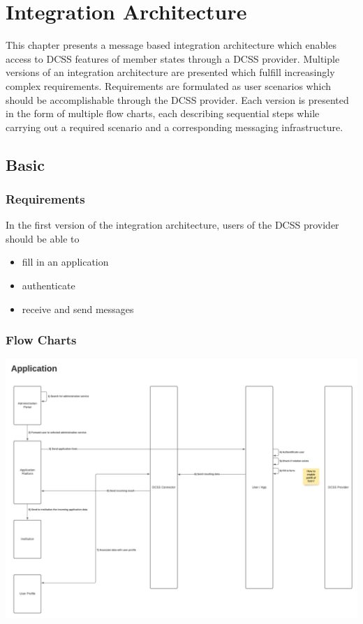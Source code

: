 \documentclass[
     12pt,         %
     a4paper,      %
     BCOR=10mm,version=first,     %
     DIV=14,version=first,        %
     ]{scrreprt}
\begin{document}
\chapter{Integration Architecture}

This chapter presents a message based integration architecture which enables access to DCSS features of member states through a DCSS provider. Multiple versions of an integration architecture are presented which fulfill increasingly complex requirements. Requirements are formulated as user scenarios which should be accomplishable through the DCSS provider.
Each version is presented in the form of multiple flow charts, each describing sequential steps while carrying out a required scenario and a corresponding messaging infrastructure.

\section{Basic}

\subsection{Requirements}
In the first version of the integration architecture, users of the DCSS provider should be able to
\begin{itemize}
    \item fill in an application
    \item authenticate
    \item receive and send messages
\end{itemize}

\subsection{Flow Charts}

\includegraphics[width=\textwidth]{Basic Integration Application.png}
\end{document}
